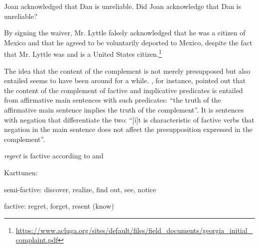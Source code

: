 \documentclass[11pt,fleqn]{article}
\newcommand{\6}{\mbox{$[\hspace*{-.6mm}[$}}
\newcommand{\9}{\mbox{$]\hspace*{-.6mm}]$}}
\begin{document}
\begin{exe}
\ex\label{kip3}
\begin{xlist}
\ex Joan acknowledged that Dan is unreliable.
\ex Did Joan acknowledge that Dan is unreliable?

\ex By signing the waiver, Mr. Lyttle
falsely acknowledged that he was a citizen of Mexico and that he agreed to be
voluntarily deported to Mexico, despite the fact that Mr. Lyttle was and is a United
States citizen.\footnote{\url{https://www.acluga.org/sites/default/files/field_documents/georgia_initial_complaint.pdf}}
\end{xlist}

\end{exe}

The idea that the content of the complement is not merely presupposed but also entailed seems to have been around for a while. \citealt[342f]{karttunen71-implicative}, for instance, pointed out that the content of the complement of factive and implicative predicates is entailed from affirmative main sentences with such predicates: ``the truth of the affirmative main sentence implies the truth of the complement''. It is sentences with negation that differentiate the two: ``[i]t is characteristic of factive verbs that negation in the main sentence does not affect the presupposition expressed in the complement''. 

{\em regret} is factive according to \citet[55]{karttunen71b} and \citealt{kiparsky-kiparsky70}

Karttunen:

semi-factive: discover, realize, find out, see, notice

factive: regret, forget, resent (know)
\end{document}
